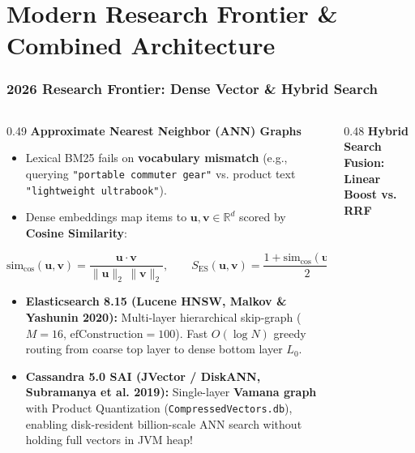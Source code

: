 \documentclass[aspectratio=169]{beamer}
\begin{document}
\section{Modern Research Frontier \& Combined Architecture}

\begin{frame}
\frametitle{2026 Research Frontier: Dense Vector \& Hybrid Search}
\begin{columns}[T]
\begin{column}{0.49\textwidth}
\textbf{\scriptsize Approximate Nearest Neighbor (ANN) Graphs}
\tiny
\begin{itemize}
    \item Lexical BM25 fails on \textbf{vocabulary mismatch} (e.g., querying \texttt{"portable commuter gear"} vs. product text \texttt{"lightweight ultrabook"}).
    \item Dense embeddings map items to $\mathbf{u}, \mathbf{v} \in \mathbb{R}^d$ scored by \textbf{Cosine Similarity}:
\end{itemize}
\vspace{-0.15cm}
{\tiny
\[
\text{sim}_{\cos}(\mathbf{u}, \mathbf{v}) = \frac{\mathbf{u} \cdot \mathbf{v}}{\|\mathbf{u}\|_2 \, \|\mathbf{v}\|_2}, \qquad S_{\text{ES}}(\mathbf{u}, \mathbf{v}) = \frac{1 + \text{sim}_{\cos}(\mathbf{u}, \mathbf{v})}{2}
\]
}
\vspace{-0.12cm}
\tiny
\begin{itemize}
    \item \textbf{Elasticsearch 8.15 (Lucene HNSW, Malkov \& Yashunin 2020):} Multi-layer hierarchical skip-graph ($M=16$, $\text{efConstruction}=100$). Fast $O(\log N)$ greedy routing from coarse top layer to dense bottom layer $L_0$.
    \item \textbf{Cassandra 5.0 SAI (JVector / DiskANN, Subramanya et al. 2019):} Single-layer \textbf{Vamana graph} with Product Quantization (\texttt{CompressedVectors.db}), enabling disk-resident billion-scale ANN search without holding full vectors in JVM heap!
\end{itemize}
\end{column}
\begin{column}{0.48\textwidth}
\textbf{\scriptsize Hybrid Search Fusion: Linear Boost vs. RRF}
\tiny
\begin{itemize}

\end{itemize}
\end{column}
\end{columns}
\end{frame}
\end{document}
